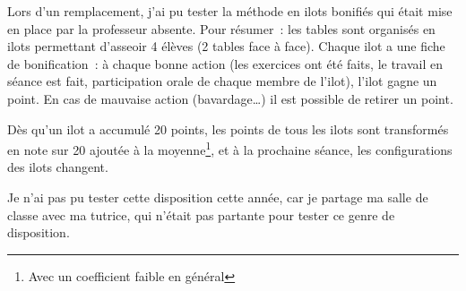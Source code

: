 Lors d'un remplacement, j'ai pu tester la méthode en ilots bonifiés qui était mise
en place par la professeur absente. Pour résumer : les tables sont organisés
en ilots permettant d'asseoir 4 élèves (2 tables face à face). Chaque ilot a une
fiche de bonification : à chaque bonne action (les exercices ont été faits, le travail
en séance est fait, participation orale de chaque membre de l'ilot), l'ilot gagne un point.
En cas de mauvaise action (bavardage…) il est possible de retirer un point.

Dès qu'un ilot a accumulé 20 points, les points de tous les ilots sont transformés
en note sur 20 ajoutée à la moyenne\footnote{Avec un coefficient faible en général},
et à la prochaine séance, les configurations des ilots changent.

Je n'ai pas pu tester cette disposition cette année, car je partage ma salle de classe
avec ma tutrice, qui n'était pas partante pour tester ce genre de disposition.
